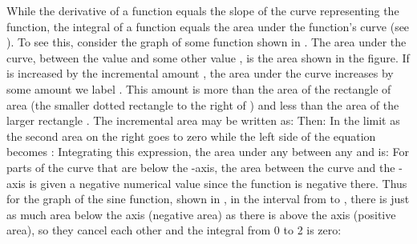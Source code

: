 {
While the derivative of a function equals the slope of the curve
representing the function, the integral of a function equals the area under
the function's curve (see ).
To see this, consider the graph of some function  shown in .
The area under the curve, between the value  and some other value ,
is the area  shown in the figure.
If  is increased by the incremental amount , the area under the
curve increases by some amount we label .
This amount  is more than the area of the rectangle of area
 (the
smaller dotted rectangle to the right of ) and less than the area of the
larger rectangle .
The incremental area may be written as:
%
%
Then:
%
%
In the limit as  the second area on the right goes
to zero while the left side of the equation becomes :
%
%
Integrating this expression, the area under any  between any  and
 is:
%
%
For parts of the curve that are below the -axis, the area between the
curve and the -axis is given a negative numerical value since the
function is negative there.
Thus for the graph of the sine function, shown in , in the interval
from  to , there is just as much area below the axis
(negative area) as there is above the axis (positive area), so they cancel
each other and the integral from 0 to 2\m{\pi}  is zero:

%
}%
%
%
